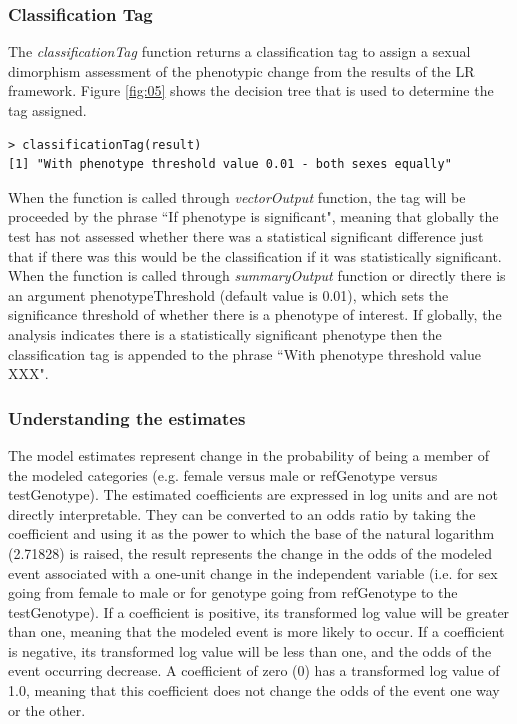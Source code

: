 \documentclass[12pt,a4paper]{article}
\begin{document}
\subsubsection{Classification Tag}
The \textit{classificationTag} function returns a classification tag to assign a sexual dimorphism assessment of the phenotypic change from the results of the LR framework. Figure \ref{fig:05} shows the decision tree that is used to determine the tag assigned.

\begingroup
    \fontsize{8pt}{12pt}\selectfont
\begin{verbatim}
> classificationTag(result)
[1] "With phenotype threshold value 0.01 - both sexes equally"
\end{verbatim}
\endgroup

When the function is called through \textit{vectorOutput} function, the tag will be proceeded by the phrase “If phenotype is significant", meaning that globally the test has not assessed whether there was a statistical significant difference just that if there was this would be the classification if it was statistically significant. When the function is called through \textit{summaryOutput} function or directly there is an argument phenotypeThreshold (default value is 0.01), which sets the significance threshold of whether there is a phenotype of interest. If globally, the analysis indicates there is a statistically significant phenotype then the classification tag is appended to the phrase “With phenotype threshold value XXX".

\subsubsection{Understanding the estimates}
The model estimates represent change in the probability of being a member of the modeled categories (e.g. female versus male or refGenotype versus testGenotype).  The estimated coefficients are expressed in log units and are not directly interpretable. They can be converted to an odds ratio by taking the coefficient and using it as the power to which the base of the natural logarithm (2.71828) is raised, the result represents the change in the odds of the modeled event associated with a one-unit change in the independent variable (i.e. for sex going from female to male or for genotype going from refGenotype to the testGenotype). 
If a coefficient is positive, its transformed log value will be greater than one, meaning that the modeled event is more likely to occur. If a coefficient is negative, its transformed log value will be less than one, and the odds of the event occurring decrease. A coefficient of zero (0) has a transformed log value of 1.0, meaning that this coefficient does not change the odds of the event one way or the other.
\end{document}
